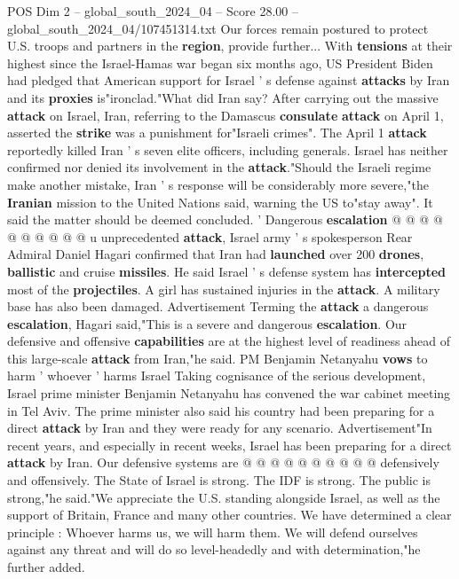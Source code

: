 \begin{textsample}{POS Dim 2 – global\_south\_2024\_04 – Score 28.00 – global\_south\_2024\_04/107451314.txt}
Our forces remain postured to protect U.S. troops and partners in the \textbf{region}, provide further...
With \textbf{tensions} at their highest since the Israel-Hamas war began six months ago, US President Biden had pledged that American support for Israel ' s defense against \textbf{attacks} by Iran and its \textbf{proxies} is"ironclad."What did Iran say?
After carrying out the massive \textbf{attack} on Israel, Iran, referring to the Damascus \textbf{consulate} \textbf{attack} on April 1, asserted the \textbf{strike} was a punishment for"Israeli crimes".
The April 1 \textbf{attack} reportedly killed Iran ' s seven elite officers, including generals.
Israel has neither confirmed nor denied its involvement in the \textbf{attack}."Should the Israeli regime make another mistake, Iran ' s response will be considerably more severe,"the \textbf{Iranian} mission to the United Nations said, warning the US to"stay away".
It said the matter should be deemed concluded. ' Dangerous \textbf{escalation} @ @ @ @ @ @ @ @ @ @ u unprecedented \textbf{attack}, Israel army ' s spokesperson Rear Admiral Daniel Hagari confirmed that Iran had \textbf{launched} over 200 \textbf{drones}, \textbf{ballistic} and cruise \textbf{missiles}.
He said Israel ' s defense system has \textbf{intercepted} most of the \textbf{projectiles}.
A girl has sustained injuries in the \textbf{attack}.
A military base has also been damaged.
Advertisement Terming the \textbf{attack} a dangerous \textbf{escalation}, Hagari said,"This is a severe and dangerous \textbf{escalation}.
Our defensive and offensive \textbf{capabilities} are at the highest level of readiness ahead of this large-scale \textbf{attack} from Iran,"he said.
PM Benjamin Netanyahu \textbf{vows} to harm ' whoever ' harms Israel Taking cognisance of the serious development, Israel prime minister Benjamin Netanyahu has convened the war cabinet meeting in Tel Aviv.
The prime minister also said his country had been preparing for a direct \textbf{attack} by Iran and they were ready for any scenario.
Advertisement"In recent years, and especially in recent weeks, Israel has been preparing for a direct \textbf{attack} by Iran.
Our defensive systems are @ @ @ @ @ @ @ @ @ @ defensively and offensively.
The State of Israel is strong.
The IDF is strong.
The public is strong,"he said."We appreciate the U.S. standing alongside Israel, as well as the support of Britain, France and many other countries.
We have determined a clear principle : Whoever harms us, we will harm them.
We will defend ourselves against any threat and will do so level-headedly and with determination,"he further added.

\end{textsample}
